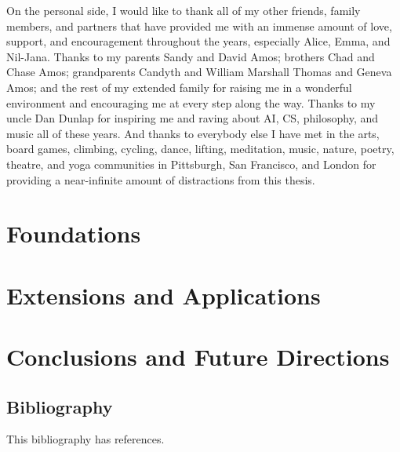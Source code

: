 \documentclass[12pt]{cmuthesis}
\begin{document}
\begin{acknowledgments}
  On the personal side, I would like to thank all of my
  other friends, family members, and partners that
  have provided me with an immense amount of love,
  support, and encouragement throughout the years,
  especially Alice, Emma, and Nil-Jana.
  Thanks to my parents Sandy and David Amos;
  brothers Chad and Chase Amos;
  grandparents Candyth and William Marshall Thomas
  and Geneva Amos; and the rest of my extended family
  for raising me in a wonderful environment and
  encouraging me at every step along the way.
  Thanks to my uncle Dan Dunlap for inspiring me and
  raving about AI, CS, philosophy, and music all of these years.
  And thanks to everybody else I have met in the
  arts,
  board games,
  climbing,
  cycling,
  dance,
  lifting,
  meditation,
  music,
  nature,
  poetry,
  theatre, and
  yoga
  communities in Pittsburgh, San Francisco, and London for
  providing a near-infinite amount of distractions from
  this thesis.
\end{acknowledgments}

\pagestyle{plain}

\tableofcontents
\listoffigures
\listoftables
\listofalgorithms

\mainmatter




\part{Foundations}



\part{Extensions and Applications}




\part{Conclusions and Future Directions}


\chapter*{Bibliography}

\vspace{-25mm}
This bibliography has  references.
\vspace{10mm}

\printbibliography[heading=none]
\end{document}
